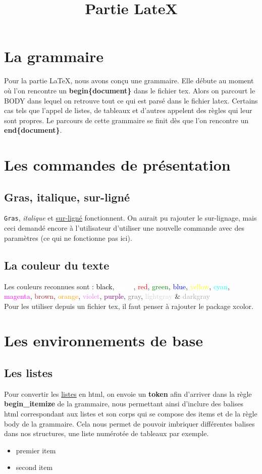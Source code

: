 \documentclass[10pt,a4paper]{report}
\begin{document}
\title{Partie LateX}


\tableofcontents

\section{La grammaire}
Pour la partie LaTeX, nous avons conçu une grammaire. Elle débute au moment où l'on rencontre un {\bf begin\{document\}} dans le fichier tex. Alors on parcourt le BODY dans lequel on retrouve tout ce qui est parsé dans le fichier latex. Certains cas tels que l'appel de listes, de tableaux et d'autres appelent des règles qui leur sont propres. Le parcours de cette grammaire se finit dès que l'on rencontre un {\bf end\{document\}}.

\section{Les commandes de présentation}
\subsection{Gras, italique, sur-ligné}
\texttt{Gras}, \textit{italique} et \underline{sur-ligné} fonctionnent.
On aurait pu rajouter le sur-lignage, mais ceci demandé encore à l'utilisateur d'utiliser une nouvelle commande avec des paramètres (ce qui ne fonctionne pas ici).
\subsection{La couleur du texte}
Les couleurs reconnues sont : \textcolor{black}{black}, \textcolor{white}{white}, \textcolor{red}{red}, \textcolor{green}{green}, \textcolor{blue}{blue}, \textcolor{yellow}{yellow}, \textcolor{cyan}{cyan}, \textcolor{magenta}{magenta}, \textcolor{brown}{brown}, \textcolor{orange}{orange}, \textcolor{violet}{violet}, \textcolor{purple}{purple}, \textcolor{gray}{gray}, \textcolor{lightgray}{lightgray} & \textcolor{darkgray}{darkgray}\\Pour les utiliser depuis un fichier tex, il faut penser à rajouter le package xcolor.


\section{Les environnements de base}
\subsection{Les listes}
Pour convertir les \underline{listes} en html, on envoie un {\bf token} afin d'arriver dans la règle {\bf begin_itemize} de la grammaire, nous permettant ainsi d'inclure des balises html correspondant aux listes et son corps qui se compose des items et de la règle body de la grammaire. Cela nous permet de pouvoir imbriquer différentes balises dans nos structures, une liste numérotée de tableaux par exemple.
\begin{itemize}
\item premier item
\item second item
\end{itemize}
\end{document}
